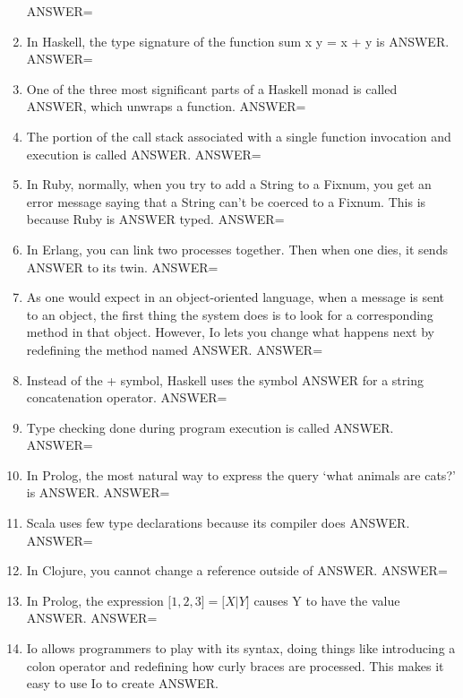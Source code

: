 \documentclass{exam}
\begin{document}
\begin{enumerate}
ANSWER=
\item In Haskell, the type signature of the function sum x y = x + y is ANSWER.\newline
ANSWER=
\item One of the three most significant parts of a Haskell monad is called ANSWER, which unwraps a function.\newline
ANSWER=
\item The portion of the call stack associated with a single function invocation and execution is called ANSWER.\newline
ANSWER=
\item In Ruby, normally, when you try to add a String to a Fixnum, you get an error message saying that a String can't be coerced to a Fixnum.  This is because Ruby is ANSWER typed.\newline
ANSWER=
\item In Erlang, you can link two processes together.  Then when one dies, it sends ANSWER to its twin.\newline
ANSWER=
\item As one would expect in an object-oriented language, when a message is sent to an object, the first thing the system does is to look for a corresponding method in that object.  However, Io lets you change what happens next by redefining the method named ANSWER.\newline
ANSWER=
\item Instead of the +  symbol, Haskell uses the symbol ANSWER for a string concatenation operator.\newline
ANSWER=
\item Type checking done during program execution is called ANSWER.\newline
ANSWER=
\item In Prolog, the most natural way to express the query `what animals are cats?' is ANSWER.\newline
ANSWER=
\item Scala uses few type declarations because its compiler does ANSWER.\newline
ANSWER=
\item In Clojure, you cannot change a reference outside of ANSWER.\newline
ANSWER=
\item In Prolog, the expression $\lbrack 1, 2, 3\rbrack = \lbrack X | Y\rbrack$ causes Y to have the value ANSWER.\newline
ANSWER=
\item Io allows programmers to play with its syntax, doing things like introducing a colon operator and redefining how curly braces are processed.  This makes it easy to use Io to create ANSWER.\newline

\end{enumerate}
\end{document}
